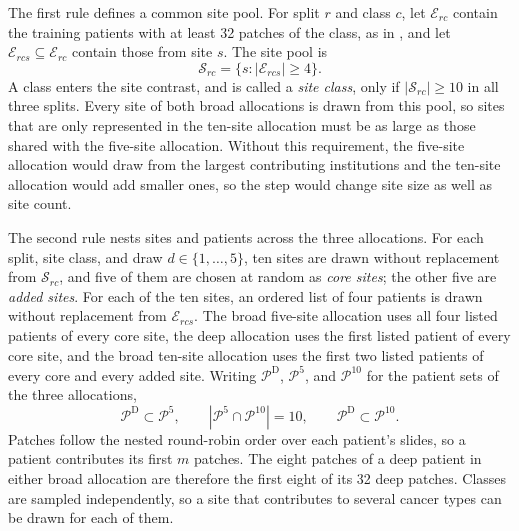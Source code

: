 \documentclass[11pt]{article}
\begin{document}
The first rule defines a common site pool. For split $r$ and class $c$, let $\mathcal E_{rc}$ contain the training patients with at least 32 patches of the class, as in \citet{queisler2026effectiveSupport}, and let $\mathcal E_{rcs}\subseteq\mathcal E_{rc}$ contain those from site $s$. The site pool is
\begin{equation}
 \mathcal S_{rc}=\{s:|\mathcal E_{rcs}|\ge 4\}.
 \label{eq:site-pool}
\end{equation}
\noindent A class enters the site contrast, and is called a \emph{site class}, only if $|\mathcal S_{rc}|\ge 10$ in all three splits. Every site of both broad allocations is drawn from this pool, so sites that are only represented in the ten-site allocation must be as large as those shared with the five-site allocation. Without this requirement, the five-site allocation would draw from the largest contributing institutions and the ten-site allocation would add smaller ones, so the step would change site size as well as site count.

The second rule nests sites and patients across the three allocations. For each split, site class, and draw $d\in\{1,\ldots,5\}$, ten sites are drawn without replacement from $\mathcal S_{rc}$, and five of them are chosen at random as \emph{core sites}; the other five are \emph{added sites}. For each of the ten sites, an ordered list of four patients is drawn without replacement from $\mathcal E_{rcs}$. The broad five-site allocation uses all four listed patients of every core site, the deep allocation uses the first listed patient of every core site, and the broad ten-site allocation uses the first two listed patients of every core and every added site. Writing $\mathcal P^{\mathrm D}$, $\mathcal P^{5}$, and $\mathcal P^{10}$ for the patient sets of the three allocations,
\begin{equation}
 \mathcal P^{\mathrm D}\subset\mathcal P^{5},
 \qquad
 |\mathcal P^{5}\cap\mathcal P^{10}|=10,
 \qquad
 \mathcal P^{\mathrm D}\subset\mathcal P^{10}.
 \label{eq:nesting}
\end{equation}
\noindent Patches follow the nested round-robin order over each patient's slides, so a patient contributes its first $m$ patches. The eight patches of a deep patient in either broad allocation are therefore the first eight of its 32 deep patches. Classes are sampled independently, so a site that contributes to several cancer types can be drawn for each of them.
\end{document}
